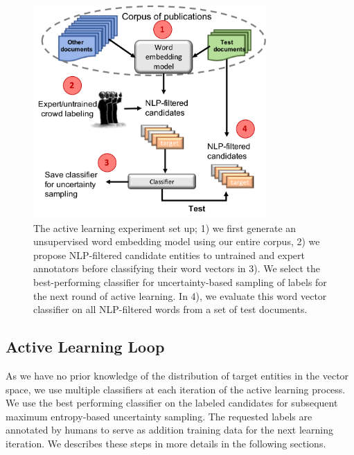 \begin{figure}
\centering
\includegraphics[trim=0in 0.1in 0.1in 0.in,clip,width=3.5in]{figures/al_setup.pdf}
\caption{\label{fig:current} The active learning experiment set up; 1) we first generate an unsupervised word embedding model using our entire corpus, 2) we propose NLP-filtered candidate entities to untrained and expert annotators before classifying their word vectors in 3). We select the best-performing classifier for uncertainty-based sampling of labels for the next round of active learning. In 4), we evaluate this word vector classifier on all NLP-filtered words from a set of test documents. 
}
\end{figure}

\subsection{Active Learning Loop}
As we have no prior knowledge of the distribution of target entities in the vector space, 
we use multiple classifiers at each iteration of the active learning process. 
We use the best performing classifier on the labeled candidates for subsequent maximum entropy-based uncertainty sampling. 
The requested labels are annotated by humans to serve as addition training data for the next learning iteration. 
We describes these steps in more details in the following sections.

